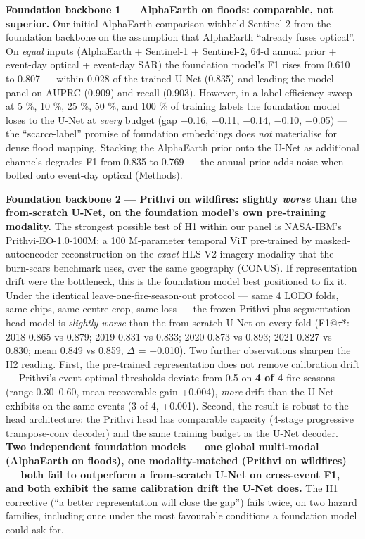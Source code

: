 \textbf{Foundation backbone 1 --- AlphaEarth on floods: comparable, not
superior.} Our initial AlphaEarth comparison withheld Sentinel-2 from
the foundation backbone on the assumption that AlphaEarth ``already fuses
optical''. On \emph{equal} inputs (AlphaEarth + Sentinel-1 + Sentinel-2, 64-d
annual prior + event-day optical + event-day SAR) the foundation model's
F1 rises from 0.610 to 0.807 --- within 0.028 of the trained U-Net (0.835)
and leading the model panel on AUPRC (0.909) and recall (0.903).
However, in a label-efficiency sweep at 5 \%, 10 \%, 25 \%, 50 \%, and 100 \%
of training labels the foundation model loses to the U-Net at \emph{every}
budget (gap $-$0.16, $-$0.11, $-$0.14, $-$0.10, $-$0.05) --- the ``scarce-label''
promise of foundation embeddings does \emph{not} materialise for dense flood
mapping. Stacking the AlphaEarth prior onto the U-Net as additional
channels degrades F1 from 0.835 to 0.769 --- the annual prior adds noise
when bolted onto event-day optical (Methods).

\textbf{Foundation backbone 2 --- Prithvi on wildfires: slightly \emph{worse} than
the from-scratch U-Net, on the foundation model's own pre-training
modality.} The strongest possible test of H1 within our panel is
NASA-IBM's Prithvi-EO-1.0-100M: a 100 M-parameter temporal ViT
pre-trained by masked-autoencoder reconstruction on the \emph{exact} HLS V2
imagery modality that the burn-scars benchmark uses, over the same
geography (CONUS). If representation drift were the bottleneck, this is
the foundation model best positioned to fix it. Under the identical
leave-one-fire-season-out protocol --- same 4 LOEO folds, same chips,
same centre-crop, same loss --- the frozen-Prithvi-plus-segmentation-head
model is \emph{slightly worse} than the from-scratch U-Net on every fold
(F1@$\tau$*: 2018 0.865 vs 0.879; 2019 0.831 vs 0.833; 2020 0.873 vs 0.893;
2021 0.827 vs 0.830; mean 0.849 vs 0.859, $\Delta$ = $-$0.010). Two further
observations sharpen the H2 reading. First, the pre-trained
representation does not remove calibration drift --- Prithvi's
event-optimal thresholds deviate from 0.5 on \textbf{4 of 4} fire seasons
(range 0.30--0.60, mean recoverable gain +0.004), \emph{more} drift than the
U-Net exhibits on the same events (3 of 4, +0.001). Second, the result
is robust to the head architecture: the Prithvi head has comparable
capacity (4-stage progressive transpose-conv decoder) and the same
training budget as the U-Net decoder. \textbf{Two independent foundation
models --- one global multi-modal (AlphaEarth on floods), one
modality-matched (Prithvi on wildfires) --- both fail to outperform a
from-scratch U-Net on cross-event F1, and both exhibit the same
calibration drift the U-Net does.} The H1 corrective (``a better
representation will close the gap'') fails twice, on two hazard
families, including once under the most favourable conditions a
foundation model could ask for.

